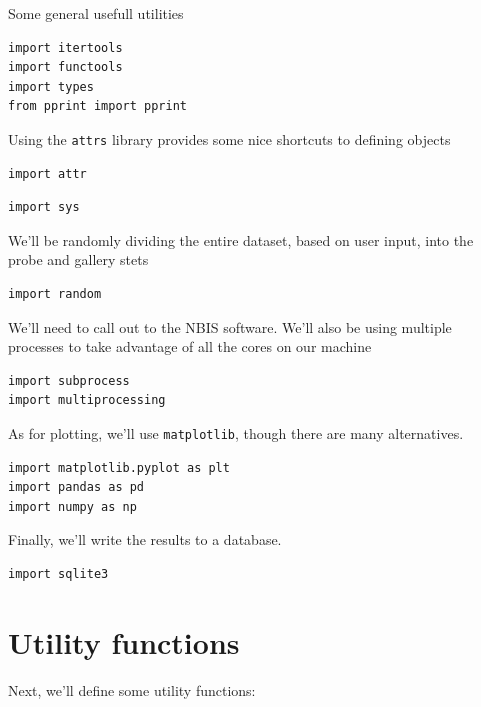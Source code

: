 Some general usefull utilities

\begin{lstlisting}
import itertools
import functools
import types
from pprint import pprint
\end{lstlisting}

Using the \texttt{attrs} library provides some nice shortcuts to
defining objects

\begin{lstlisting}
import attr
\end{lstlisting}

\begin{lstlisting}
import sys
\end{lstlisting}

We'll be randomly dividing the entire dataset, based on user input, into
the probe and gallery stets

\begin{lstlisting}
import random
\end{lstlisting}

We'll need to call out to the NBIS software. We'll also be using
multiple processes to take advantage of all the cores on our machine

\begin{lstlisting}
import subprocess
import multiprocessing
\end{lstlisting}

As for plotting, we'll use \texttt{matplotlib}, though there are many
alternatives.

\begin{lstlisting}
import matplotlib.pyplot as plt
import pandas as pd
import numpy as np
\end{lstlisting}

Finally, we'll write the results to a database.

\begin{lstlisting}
import sqlite3
\end{lstlisting}

\section{Utility functions}\label{utility-functions}

Next, we'll define some utility functions:

